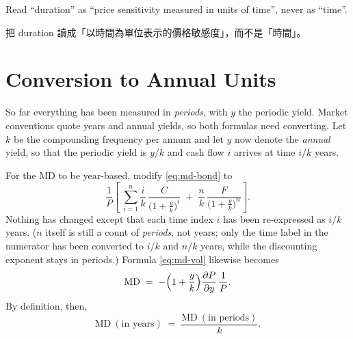 \begin{moral}
	Read ``duration'' as ``price sensitivity measured in units of time'', never as ``time''.

	把 duration 讀成「以時間為單位表示的價格敏感度」，而不是「時間」。
\end{moral}
\suppend

\section{Conversion to Annual Units}
\label{sec:conversion-annual}


So far everything has been measured in \emph{periods}, with $y$ the periodic yield.
Market conventions quote years and annual yields, so both formulas need converting.
Let $k$ be the compounding frequency per annum and let $y$ now denote the \emph{annual} yield, so that the periodic yield is $y/k$ and cash flow $i$ arrives at time $i/k$ years.

For the MD to be year-based, modify \eqref{eq:md-bond} to
\begin{equation}
	\frac{1}{P}\left[\;\sum_{i=1}^{n}\frac{i}{k}\,\frac{C}{\bigl(1+\frac{y}{k}\bigr)^{i}}
		\;+\; \frac{n}{k}\,\frac{F}{\bigl(1+\frac{y}{k}\bigr)^{n}}\right] . \label{eq:md-years}
\end{equation}
Nothing has changed except that each time index $i$ has been re-expressed as $i/k$ years.
($n$ itself is still a count of \emph{periods}, not years; only the time label in the numerator has been converted to $i/k$ and $n/k$ years, while the discounting exponent stays in periods.)
Formula \eqref{eq:md-vol} likewise becomes
\begin{equation}
	\mathrm{MD} \;=\; -\Bigl(1+\frac{y}{k}\Bigr)\frac{\partial P}{\partial y}\,\frac{1}{P}. \label{eq:md-vol-years}
\end{equation}
By definition, then,
\[
	\mathrm{MD}\ (\text{in years}) \;=\; \frac{\mathrm{MD}\ (\text{in periods})}{k}.
\]

